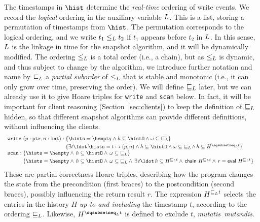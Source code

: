 The timestamps in $\hist$ determine the \emph{real-time} ordering of
write events. We record the \emph{logical} ordering in the auxiliary
variable $L$. This is a list, storing a permutation of
timestamps from $\hist$. The permutation corresponds to the logical
ordering, and we write $t_1 \mathrel{\leq_L} t_2$ if $t_1$ appears before $t_2$
in $L$. In this sense, $L$ is the linkage in time for
the snapshot algorithm, and it will be dynamically modified. The
ordering $\mathrel{\leq_L}$ is a total order (i.e., a chain), but as $\mathrel{\leq_L}$ is
dynamic, and thus subject to change by the algorithm, we introduce
further notation and name by $\mathrel{\sqsubseteq_L}$ a \emph{partial suborder} of
$\mathrel{\leq_L}$ that is stable and monotonic (i.e., it can only grow over
time, preserving the order). We will define $\mathrel{\sqsubseteq_L}$ later, but we can
already use it to give Hoare triples for {\tt write} and {\tt scan}
below. In fact, it will be important for client reasoning
(Section~\ref{sec:clients}) to keep the definition of $\mathrel{\sqsubseteq_L}$ hidden,
so that different snapshot algorithms can provide different
definitions, without influencing the clients.
%
\begin{equation}
\begin{array}{l}
\mathtt{write}\ (p : \mathtt{ptr}, n : \mathtt{int}) : 
\!\!\!\begin{array}[t]{l}
\{\hists = \hempty \wedge h \subseteq \histO
           \wedge \omega \subseteq {\jleq}\}\\[3pt]
\{\exists t\ldot\, \hists = t \mapsto (p, n) \wedge h \subseteq \histO \wedge
  \omega \subseteq {\jleq}\,{\wedge}\, h \subseteq H^{\hbox{}\sqsubsetneq_\ordlist t}\}
\end{array}\\
%
\mathtt{scan} : 
\!\!\!\begin{array}[t]{l}
\{\hists = \hempty \wedge\, h \subseteq \histO \wedge\,
          \omega \subseteq {\jleq}\}\\[3pt]
\{\hists = \hempty \wedge\, h \subseteq \histO \wedge\, \omega \subseteq {\jleq} \wedge\, \exists\, t\ldot\, %
           h \subseteq H^{\hbox{}\sqsubseteq_\ordlist t} \wedge\,
           \mathsf{chain}\ H^{\hbox{}\sqsubseteq_\ordlist t} \wedge\, r = \mathsf{eval}\ {H^{\hbox{}\sqsubseteq_\ordlist t}}\}
\end{array}
\end{array}
\label{eq:specs}
\end{equation}
%
These are partial correctness Hoare triples, describing how the
program changes the state from the precondition (first braces) to the
postcondition (second braces), possibly influencing the return result
$r$.
%
The expression $H^{\hbox{}\sqsubseteq_L t}$ selects the entries
in the history $H$ \emph{up to and including} the timestamp $t$,
according to the ordering $\sqsubseteq_L$. Likewise,
$H^{\hbox{}\sqsubsetneq_\ordlist t}$ is defined to exclude $t$, {\it
  mutatis~mutandis}.
%

